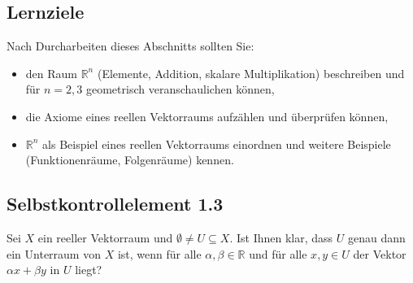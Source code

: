 \documentclass[a4paper,12pt]{article}
\begin{document}
\begin{center}
\end{center}

\subsection*{Lernziele}

Nach Durcharbeiten dieses Abschnitts sollten Sie:
\begin{itemize}
  \item den Raum $\mathbb{R}^n$ (Elemente, Addition, skalare Multiplikation) beschreiben
        und für $n = 2, 3$ geometrisch veranschaulichen können,
  \item die Axiome eines reellen Vektorraums aufzählen und überprüfen können,
  \item $\mathbb{R}^n$ als Beispiel eines reellen Vektorraums einordnen und weitere
        Beispiele (Funktionenräume, Folgenräume) kennen.
\end{itemize}

\subsection*{Selbstkontrollelement 1.3}

Sei $X$ ein reeller Vektorraum und $\emptyset \neq U \subseteq X$. Ist Ihnen klar,
dass $U$ genau dann ein Unterraum von $X$ ist, wenn für alle $\alpha, \beta \in \mathbb{R}$
und für alle $x, y \in U$ der Vektor $\alpha x + \beta y$ in $U$ liegt?
\end{document}

